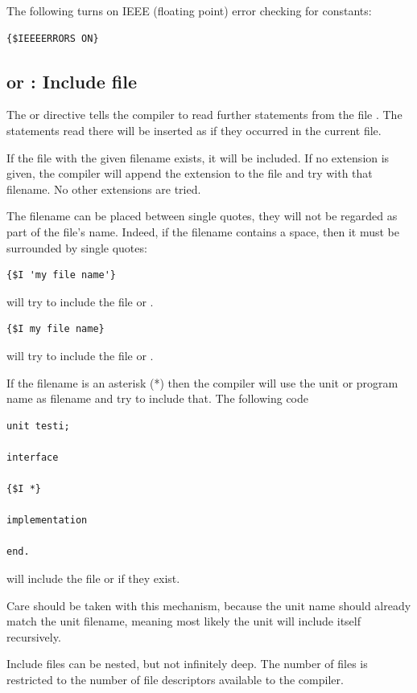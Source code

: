 The following turns on IEEE (floating point) error checking for constants:
\begin{verbatim}
{$IEEEERRORS ON}
\end{verbatim}

\subsection{ or  : Include file }

The  or  directive
tells the compiler to read further statements from the file .
The statements read there will be inserted as if they occurred in the
current file.

If the file with the given filename exists, it will be included.
If no extension is given, the compiler will append the  
extension to the file and try with that filename. No other extensions are
tried. 

The filename can be placed between single quotes, they will not be 
regarded as part of the file's name. Indeed, if the filename contains 
a space, then it must be surrounded by single quotes: 

\begin{verbatim}
{$I 'my file name'}
\end{verbatim}
will try to include the file  or .

\begin{verbatim}
{$I my file name}
\end{verbatim}
will try to include the file  or .

If the filename is an asterisk (*) then the compiler will use the unit or
program name as filename and try to include that. The following code

\begin{verbatim}
unit testi;

interface

{$I *}

implementation

end.
\end{verbatim}
will include the file  or  if they exist.

Care should be taken with this mechanism, because the unit name should
already match the unit filename, meaning most likely the unit will include
itself recursively.

Include files can be nested, but not infinitely deep. The number of files is
restricted to the number of file descriptors available to the \fpc compiler.

